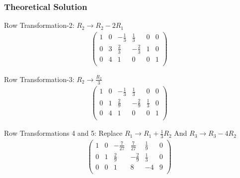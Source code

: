 \documentclass{beamer}
\begin{document}
\begin{frame}[fragile]
    \frametitle{Theoretical Solution}

Row Transformation-2: $R_2 \rightarrow R_2 - 2R_1$
\begin{align}
\left(
\begin{array}{ccc|ccc}
1 & 0 & -\frac{1}{3} & \frac{1}{3} & 0 & 0 \\
0 & 3 & \frac{2}{3} & -\frac{2}{3} & 1 & 0 \\
0 & 4 & 1 & 0 & 0 & 1 \\
\end{array}
\right)
\end{align}

Row Transformation-3: $R_2 \rightarrow \frac{R_2}{3}$
\begin{align}
\left(
\begin{array}{ccc|ccc}
1 & 0 & -\frac{1}{3} & \frac{1}{3} & 0 & 0 \\
0 & 1 & \frac{2}{9} & -\frac{2}{9} & \frac{1}{3} & 0 \\
0 & 4 & 1 & 0 & 0 & 1 \\
\end{array}
\right)
\end{align}

Row Transformations 4 and 5: Replace $R_1 \rightarrow R_1 + \frac{1}{3}R_2$ And $R_3 \rightarrow R_3 - 4R_2$
\begin{align}
\left(
\begin{array}{ccc|ccc}
1 & 0 & -\frac{7}{27} & \frac{7}{27} & \frac{1}{9} & 0 \\
0 & 1 & \frac{2}{9} & -\frac{2}{9} & \frac{1}{3} & 0 \\
0 & 0 & 1 & 8 & -4 & 9 \\
\end{array}
\right)
\end{align}
\end{frame}
\end{document}
